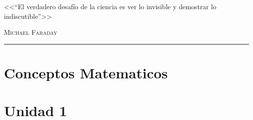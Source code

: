 \documentclass[12pt,a4paper]{book}
\begin{document}
\renewcommand{\contentsname}{\vspace{0cm} Contenido \vspace{-2cm}}

\begin{titlepage}
\vspace*{2cm}

\noindent
\vspace*{0.5cm}

\vspace{1.5cm}
\epigraph{<<``El verdadero desafío de la ciencia es ver lo invisible y demostrar lo indiscutible''>>}%
{ \textsc{Michael Faraday}}
\null\vfill
\vspace*{1cm}
\noindent
\hfill
\begin{minipage}{0.7\linewidth}
    \begin{flushright}
        \printauthor %
    \end{flushright}
\end{minipage}
%
\begin{minipage}{0.02\linewidth}
    \rule{1pt}{70pt}
\end{minipage}
\titlepagedecoration
\end{titlepage}

\let\cleardoublepage=\clearpage
\tableofcontents
\blankpage

\chapter{Conceptos Matematicos}

\newpage\thispagestyle{empty}\blankpage
\chapter{Unidad 1}



\blankpage


\nocite{*}
\end{document}
